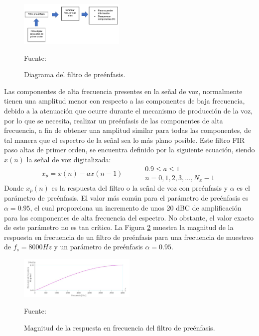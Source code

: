 \begin{enumerate}
\begin{figure}[ht]
\begin{center}
\includegraphics[width=0.45\textwidth]{Imagenes/Cap2/image031}
\end{center}
\begin{center}
\vskip -0.5cm
\caption{\small{Diagrama del filtro de preénfasis.}}
\label{fig:figura2.30}
{\small{Fuente: \cite{eyra}}}
\end{center}
\end{figure}
\vskip -0.5cm
Las componentes de alta frecuencia presentes en la señal de voz, normalmente tienen una amplitud menor con respecto a las componentes de baja frecuencia, debido a la atenuación que ocurre durante el mecanismo de producción de la voz, por lo que se necesita, realizar un preénfasis de las componentes de alta frecuencia, a fin de obtener una amplitud similar para todas las componentes, de tal manera que el espectro de la señal sea lo más plano posible. Este filtro FIR paso altas de primer orden, se encuentra definido por la siguiente ecuación, siendo $x(n)$ la señal de voz digitalizada:
\begin{equation}
\label{eq:ecuacion32}
x_{p} = x(n) - ax(n-1)\qquad
\begin{aligned}
& 0.9 \leq a \leq 1 \\
& n = 0,1,2,3,...,N_{x} - 1
\end{aligned}
\end{equation}
Donde $x_{p}(n)$ es la respuesta del filtro o la señal de voz con preénfasis y $\alpha$ es el parámetro de preénfasis. El valor más común para el parámetro de preénfasis es $\alpha = 0.95$, el cual proporciona un incremento de unos 20 dBC de amplificación para las componentes de alta frecuencia del espectro. No obstante, el valor exacto de este parámetro no es tan crítico. La Figura \ref{fig:figura2.31} muestra la magnitud de la respuesta en frecuencia de un filtro de preénfasis para una frecuencia de muestreo de $f_{s} = 8000 Hz$ y un parámetro de preénfasis $\alpha = 0.95$.
\vskip 0.2cm
\begin{figure}[ht]
\begin{center}
\includegraphics[width=0.5\textwidth]{Imagenes/Cap2/image032}
\end{center}
\begin{center}
\vskip -0.5cm
\caption{\small{Magnitud de la respuesta en frecuencia del filtro de preénfasis.}}
\label{fig:figura2.31}
{\small{Fuente: \cite{perez}}}
\end{center}
\end{figure}


\end{enumerate}
